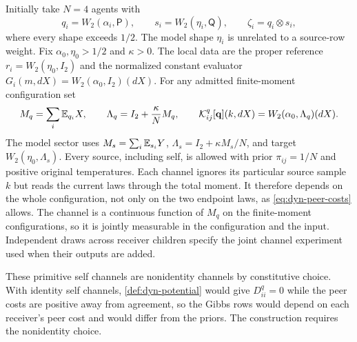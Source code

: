 Initially take $N=4$ agents with
\begin{equation}
 q_i=W_2(\alpha_i,\mathsf P),\qquad
 s_i=W_2(\eta_i,\mathsf Q),\qquad
 \zeta_i=q_i\otimes s_i,
 \label{form:family}
\end{equation}
where every shape exceeds $1/2$. The model shape $\eta_i$ is unrelated to a
source-row weight. Fix $\alpha_0,\eta_0>1/2$ and $\kappa>0$. The local data are
the proper reference $r_i=W_2(\eta_0,I_2)$ and the normalized constant
evaluator $G_i(m,dX)=W_2(\alpha_0,I_2)(dX)$. For any admitted finite-moment
configuration set
\begin{equation}
 M_q=\sum_i\mathbb E_{q_i}X,\qquad
 \Lambda_q=I_2+\frac{\kappa}{N}M_q,\qquad
 \mathcal K^q_{ij}[\mathbf q](k,dX)=W_2(\alpha_0,\Lambda_q)(dX).
 \label{form:channel}
\end{equation}
The model sector uses $M_s=\sum_i\mathbb E_{s_i}Y$,
$\Lambda_s=I_2+\kappa M_s/N$, and target $W_2(\eta_0,\Lambda_s)$.
Every source, including self, is allowed with prior $\pi_{ij}=1/N$ and
positive original temperatures. Each channel ignores its particular source sample $k$ but reads the current laws
through the total moment. It therefore depends on the whole configuration, not only on the two endpoint laws, as \cref{eq:dyn-peer-costs} allows. The channel is a continuous function of $M_q$ on the finite-moment configurations, so it is jointly measurable in the configuration and the input. Independent draws across receiver children specify
the joint channel experiment used when their outputs are added.

These primitive self channels are nonidentity channels by constitutive choice. With identity self channels, \cref{def:dyn-potential} would give $D^q_{ii}=0$ while the peer costs are positive away from agreement, so the Gibbs rows would depend on each receiver's peer cost and would differ from the priors. The construction requires the nonidentity choice.

